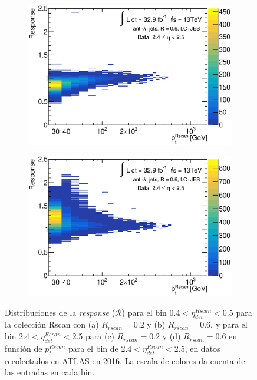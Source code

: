 \begin{figure}[ht]
\begin{subfigure}[b]{0.495\textwidth}
        \includegraphics[width=\textwidth]{images/Th2_Data_2lc_eta69}
        \caption{}
    \end{subfigure}
    \hfill
    \begin{subfigure}[b]{0.495\textwidth}
        \centering
        \includegraphics[width=\textwidth]{images/Th2_data_6lc_eta69}
        \caption{}
    \end{subfigure}
    \caption{Distribuciones de la \textit{response} ($\mathcal{R}$) para el bin 0.4$<\eta^{Rscan}_{det}<$0.5 para la colección Rscan con (a) $R_{rscan}=$0.2 y (b) $R_{rscan}=$0.6, y para el bin 2.4$<\eta^{Rscan}_{det}<$2.5 para (c) $R_{rscan}=$0.2 y (d) $R_{rscan}=$0.6 en función de $p_t^{Rscan}$ para el bin de 2.4$<\eta^{Rscan}_{det}<$2.5, en datos recolectados en ATLAS en 2016. La escala de colores da cuenta de las entradas en cada bin.} 
    \label{fig:ResponseTH2}
\end{figure}

